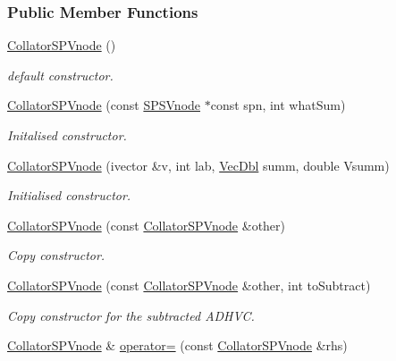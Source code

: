 \subsubsection*{\-Public \-Member \-Functions}
\begin{DoxyCompactItemize}
\item 
\hyperlink{classsubpavings_1_1CollatorSPVnode_afc907faf6fc53e9fdea4c6895e14a42c}{\-Collator\-S\-P\-Vnode} ()
\begin{DoxyCompactList}\small\item\em default constructor. \end{DoxyCompactList}\item 
\hyperlink{classsubpavings_1_1CollatorSPVnode_a238d7e9e52b2014b97d10903f54df691}{\-Collator\-S\-P\-Vnode} (const \hyperlink{classsubpavings_1_1SPSVnode}{\-S\-P\-S\-Vnode} $\ast$const spn, int what\-Sum)
\begin{DoxyCompactList}\small\item\em \-Initalised constructor. \end{DoxyCompactList}\item 
\hyperlink{classsubpavings_1_1CollatorSPVnode_afefc26f6a3e9ba25ccf69d47dbdf99d7}{\-Collator\-S\-P\-Vnode} (ivector \&v, int lab, \hyperlink{namespacesubpavings_a6b4d2e61b2f0b65cacc9c9322d89bc37}{\-Vec\-Dbl} summ, double \-Vsumm)
\begin{DoxyCompactList}\small\item\em \-Initialised constructor. \end{DoxyCompactList}\item 
\hyperlink{classsubpavings_1_1CollatorSPVnode_aeaf38d226e1bacab0a109a3525f73cc0}{\-Collator\-S\-P\-Vnode} (const \hyperlink{classsubpavings_1_1CollatorSPVnode}{\-Collator\-S\-P\-Vnode} \&other)
\begin{DoxyCompactList}\small\item\em \-Copy constructor. \end{DoxyCompactList}\item 
\hyperlink{classsubpavings_1_1CollatorSPVnode_ab7123fe7fb187c082d968a8d3be9944d}{\-Collator\-S\-P\-Vnode} (const \hyperlink{classsubpavings_1_1CollatorSPVnode}{\-Collator\-S\-P\-Vnode} \&other, int to\-Subtract)
\begin{DoxyCompactList}\small\item\em \-Copy constructor for the subtracted \-A\-D\-H\-V\-C. \end{DoxyCompactList}\item 
\hyperlink{classsubpavings_1_1CollatorSPVnode}{\-Collator\-S\-P\-Vnode} \& \hyperlink{classsubpavings_1_1CollatorSPVnode_a36bedf0d99a2a3e1a0188c24b68c2e18}{operator=} (const \hyperlink{classsubpavings_1_1CollatorSPVnode}{\-Collator\-S\-P\-Vnode} \&rhs)

\end{DoxyCompactItemize}
